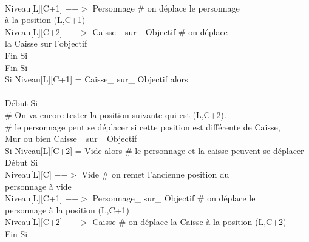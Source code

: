 \documentclass{article}
\begin{document}
\begin{tabbing}
\\	\hspace{5cm}			Niveau[L][C+1] $-->$ Personnage		\# on déplace le personnage 
\\ \hspace{5cm} à la position (L,C+1)
\\	\hspace{5cm}			Niveau[L][C+2] $-->$ Caisse\_ sur\_ Objectif	\# on déplace 
\\ \hspace{5cm} la Caisse sur l'objectif
\\	\hspace{4cm}		Fin Si
\\	\hspace{3cm}	Fin Si 
\\	\hspace{3cm}	Si Niveau[L][C+1] = Caisse\_ sur\_ Objectif alors			
\\
\\	\hspace{3cm}	Début Si
\\	\hspace{4cm}		\# On va encore tester la position suivante qui est (L,C+2). 
\\	\hspace{4cm}		\# le personnage peut se déplacer si cette position est différente de Caisse,
\\ \hspace{4cm} Mur ou bien Caisse\_ sur\_ Objectif
\\	\hspace{4cm}		Si Niveau[L][C+2] = Vide alors         			\# le personnage et la caisse peuvent se déplacer
\\	\hspace{4cm}		Début Si
\\	\hspace{5cm}			Niveau[L][C] $-->$ Vide				\# on remet l'ancienne position du
\\ \hspace{5cm} personnage à vide
\\	\hspace{5cm}		Niveau[L][C+1] $-->$ Personnage\_ sur\_ Objectif \# on déplace le 
\\ \hspace{5cm} personnage à la position (L,C+1)
\\	\hspace{5cm}			Niveau[L][C+2] $-->$ Caisse			\# on déplace la Caisse à la position (L,C+2)
\\	\hspace{4cm}		Fin Si

\end{tabbing}
\end{document}
